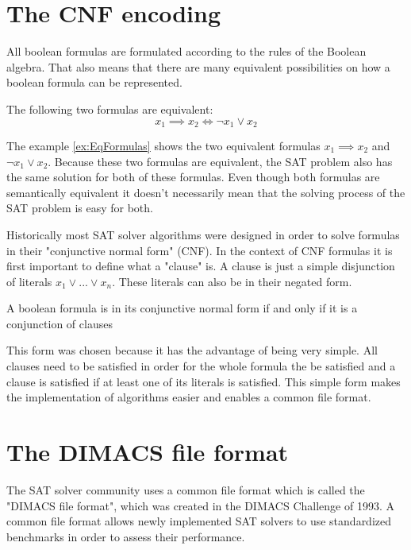 \section{The CNF encoding}

All boolean formulas are formulated according to the rules of the Boolean algebra. That also means that there are many equivalent possibilities on how a boolean formula can be represented.
\begin{leftbar}
\label{ex:EqFormulas}
The following two formulas are equivalent:
\begin{displaymath}
x_1 \implies x_2 \iff \neg x_1 \vee x_2
\end{displaymath}
\end{leftbar}

The example \ref{ex:EqFormulas} shows the two equivalent formulas $x_1 \implies x_2$ and $\neg x_1 \vee x_2$. Because these two formulas are equivalent, the SAT problem also has the same solution for both of these formulas. Even though both formulas are semantically equivalent it doesn't necessarily mean that the solving process of the SAT problem is easy for both.

Historically most SAT solver algorithms were designed in order to solve formulas in their "conjunctive normal form" (CNF). In the context of CNF formulas it is first important to define what a "clause" is. A clause is just a simple disjunction of literals $x_1 \vee ... \vee x_n$. These literals can also be in their negated form.

\begin{leftbar}
A boolean formula is in its conjunctive normal form if and only if it is a conjunction of clauses
\end{leftbar}

This form was chosen because it has the advantage of being very simple. All clauses need to be satisfied in order for the whole formula the be satisfied and a clause is satisfied if at least one of its literals is satisfied. This simple form makes the implementation of algorithms easier and enables a common file format.

\section{The DIMACS file format}

The SAT solver community uses a common file format which is called the "DIMACS file format", which was created in the DIMACS Challenge of 1993. A common file format allows newly implemented SAT solvers to use standardized benchmarks in order to assess their performance.

